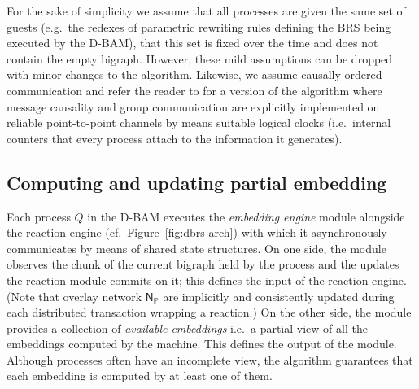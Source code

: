 \documentclass[a4paper,english,10pt]{article}
\theoremstyle{plain}\newtheorem{theorem}{Theorem}
\theoremstyle{plain}\newtheorem{corollary}[theorem]{Corollary}
\theoremstyle{plain}\newtheorem{proposition}[theorem]{Proposition}
\theoremstyle{plain}\newtheorem{lemma}[theorem]{Lemma}
\theoremstyle{plain}\newtheorem{definition}{Definition}
\theoremstyle{plain}\newtheorem{remark}{Remark}
\theoremstyle{plain}\newtheorem{example}[remark]{Example}
\newcommand{\?}[1]{}
\newcommand{\mbb}[1]{\mathbb{#1}}
\newcommand{\prt}{\mbb}
\begin{document}
For the sake of simplicity we assume that all processes are given 
the same set of guests (e.g.~the redexes of parametric rewriting rules defining the BRS
being executed by the D-BAM), that this set is fixed over the 
time and does not contain the empty bigraph. However, these mild
assumptions can be dropped with minor changes to the algorithm.
Likewise, we assume causally ordered
communication and refer the reader to \cite{mpm:gcm14w} for a version
of the algorithm where message causality and group communication are 
explicitly implemented on reliable point-to-point channels by means 
suitable logical clocks (i.e.~internal counters that every process 
attach to the information it generates).


\newcommand{\msg}[1]{\langle #1 \rangle}

\NoCaptionOfAlgo
\DontPrintSemicolon
\newcommand\mycommfont[1]{\footnotesize\textcolor{blue}{#1}}

\subsection{Computing and updating partial embedding}
Each process $Q$ in the D-BAM executes the \emph{embedding engine} module
alongside the reaction engine (cf.~Figure~\ref{fig:dbrs-arch}) with which
it asynchronously communicates by means of shared state structures.
On one side, the module observes the chunk of the current bigraph
held by the process and the updates the reaction module commits on it;
this defines the input of the reaction engine. (Note that overlay network 
$\mathsf N_\prt P$ are implicitly and consistently
updated during each distributed transaction wrapping a reaction.)
On the other side, the module provides a collection of \emph{available embeddings}
i.e.~a partial view of all the embeddings computed by the machine.
This defines the output of the module. 
Although processes often have an incomplete view, the algorithm guarantees
that each embedding is computed by at least one of them.
\end{document}
